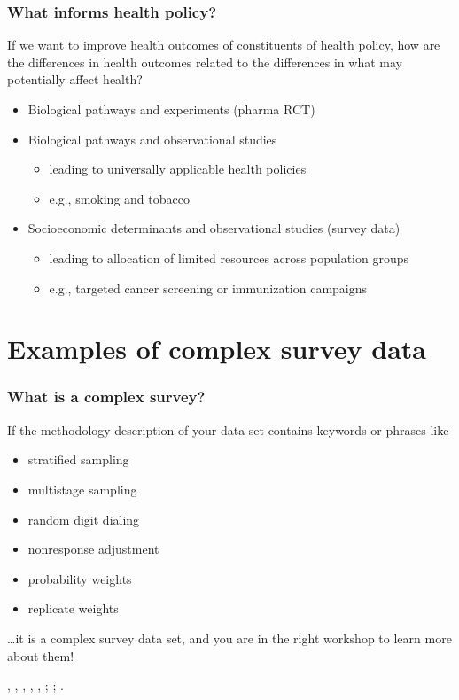 \documentclass[handout]{beamer}
\begin{document}
\begin{frame}\frametitle{What informs health policy?}

If we want to improve health outcomes of constituents of health policy,
how are the differences in health outcomes related to
the differences in what may potentially affect health?

\begin{itemize}
    \item Biological pathways and experiments (pharma RCT)
    \item Biological pathways and observational studies
    \begin{itemize}
        \item leading to universally applicable health policies
        \item e.g., smoking and tobacco
    \end{itemize}
    \item Socioeconomic determinants and observational studies (survey data)
    \begin{itemize}
        \item leading to allocation of limited resources across population groups
        \item e.g., targeted cancer screening or immunization campaigns
    \end{itemize}
\end{itemize}

\end{frame}

\section{Examples of complex survey data}

\begin{frame}\frametitle{What is a complex survey?}

If the methodology description of your data set contains keywords or phrases like
\begin{itemize}
    \item stratified sampling
    \item multistage sampling
    \item random digit dialing
    \item nonresponse adjustment
    \item probability weights
    \item replicate weights
\end{itemize}

\ldots it is a complex survey data set, and you are in the right workshop to learn more about them!

\medskip

\citet{korn:graubard:1999}, \citet{heeringa:west:berglund:2017}, \citet{lumley:2010},
\citet{chambers:skinner:2003}, \citet{pfeffermann:rao:2009}, \citet{wu:thompson:2020};
\citet{skinner:wakefield:2017};
\citet{west:sakshaug:aure:2016}.

\end{frame}
\end{document}
